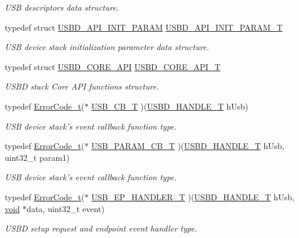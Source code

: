 \begin{DoxyCompactItemize}
\begin{DoxyCompactList}\small\item\em U\-S\-B descriptors data structure. \end{DoxyCompactList}\item 
typedef struct \hyperlink{structUSBD__API__INIT__PARAM}{U\-S\-B\-D\-\_\-\-A\-P\-I\-\_\-\-I\-N\-I\-T\-\_\-\-P\-A\-R\-A\-M} \hyperlink{group__USBD__Core_gaa6e8171941c1ae63afed95974e0f18e3}{U\-S\-B\-D\-\_\-\-A\-P\-I\-\_\-\-I\-N\-I\-T\-\_\-\-P\-A\-R\-A\-M\-\_\-\-T}
\begin{DoxyCompactList}\small\item\em U\-S\-B device stack initialization parameter data structure. \end{DoxyCompactList}\item 
typedef struct \hyperlink{structUSBD__CORE__API}{U\-S\-B\-D\-\_\-\-C\-O\-R\-E\-\_\-\-A\-P\-I} \hyperlink{group__USBD__Core_ga6a53e8395d1c68f98d18ca4a49b75baa}{U\-S\-B\-D\-\_\-\-C\-O\-R\-E\-\_\-\-A\-P\-I\-\_\-\-T}
\begin{DoxyCompactList}\small\item\em U\-S\-B\-D stack Core A\-P\-I functions structure. \end{DoxyCompactList}\item 
typedef \hyperlink{error_8h_a905255056c349318139d94aa4523d516}{Error\-Code\-\_\-t}($\ast$ \hyperlink{group__USBD__Core_ga0404ce046312aa5c798cc4a05c417e46}{U\-S\-B\-\_\-\-C\-B\-\_\-\-T} )(\hyperlink{group__USBD__Core_gafdbb2204d929cb9d75736bd2b42342ac}{U\-S\-B\-D\-\_\-\-H\-A\-N\-D\-L\-E\-\_\-\-T} h\-Usb)
\begin{DoxyCompactList}\small\item\em U\-S\-B device stack's event callback function type. \end{DoxyCompactList}\item 
typedef \hyperlink{error_8h_a905255056c349318139d94aa4523d516}{Error\-Code\-\_\-t}($\ast$ \hyperlink{group__USBD__Core_ga7df622c61ebb152b83dd5972ac789b28}{U\-S\-B\-\_\-\-P\-A\-R\-A\-M\-\_\-\-C\-B\-\_\-\-T} )(\hyperlink{group__USBD__Core_gafdbb2204d929cb9d75736bd2b42342ac}{U\-S\-B\-D\-\_\-\-H\-A\-N\-D\-L\-E\-\_\-\-T} h\-Usb, uint32\-\_\-t param1)
\begin{DoxyCompactList}\small\item\em U\-S\-B device stack's event callback function type. \end{DoxyCompactList}\item 
typedef \hyperlink{error_8h_a905255056c349318139d94aa4523d516}{Error\-Code\-\_\-t}($\ast$ \hyperlink{group__USBD__Core_gaa578d29a85226108ef62c6d5c325b742}{U\-S\-B\-\_\-\-E\-P\-\_\-\-H\-A\-N\-D\-L\-E\-R\-\_\-\-T} )(\hyperlink{group__USBD__Core_gafdbb2204d929cb9d75736bd2b42342ac}{U\-S\-B\-D\-\_\-\-H\-A\-N\-D\-L\-E\-\_\-\-T} h\-Usb, \hyperlink{Paradigm_2Tern__EE_2small_2portmacro_8h_a14d32f8130d3c0b212cfc751730b5b49}{void} $\ast$data, uint32\-\_\-t event)
\begin{DoxyCompactList}\small\item\em U\-S\-B\-D setup request and endpoint event handler type. \end{DoxyCompactList}\end{DoxyCompactItemize}
